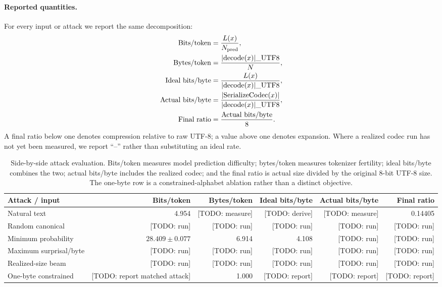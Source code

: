 \documentclass{article}
\newcommand{\todo}[1]{\textcolor{blueprint}{[TODO: #1]}}
\newcommand{\bytes}[1]{\lvert #1\rvert\_{\mathrm{UTF8}}}
\begin{document}
\paragraph{Reported quantities.}
For every input or attack we report the same decomposition:
\begin{align}
  \text{Bits/token} &= \frac{L(x)}{N_{\rm pred}},\\
  \text{Bytes/token} &= \frac{\bytes{\operatorname{decode}(x)}}{N},\\
  \text{Ideal bits/byte} &= \frac{L(x)}{\bytes{\operatorname{decode}(x)}},\\
  \text{Actual bits/byte} &=
  \frac{\left|\operatorname{SerializeCodec}(x)\right|}
       {\bytes{\operatorname{decode}(x)}},\\
  \text{Final ratio} &= \frac{\text{Actual bits/byte}}{8}.
\end{align}
A final ratio below one denotes compression relative to raw UTF-8; a value above
one denotes expansion. Where a realized codec run has not yet been measured, we
report ``--'' rather than substituting an ideal rate.

\begin{table}[t]
  \centering
  \small
  \caption{Side-by-side attack evaluation. Bits/token measures model prediction
  difficulty; bytes/token measures tokenizer fertility; ideal bits/byte combines
  the two; actual bits/byte includes the realized codec; and the final ratio is
  actual size divided by the original 8-bit UTF-8 size. The one-byte row is a
  constrained-alphabet ablation rather than a distinct objective.}
  \label{tab:decisive}
  \begin{tabular}{@{}lrrrrr@{}}
    \toprule
    Attack / input & Bits/token & Bytes/token & Ideal bits/byte & Actual bits/byte & Final ratio \\
    \midrule
    Natural text & 4.954 & \todo{measure} & \todo{derive} & \todo{measure} & 0.14405 \\
    Random canonical & \todo{run} & \todo{run} & \todo{run} & \todo{run} & \todo{run} \\
    Minimum probability & $28.409\pm0.077$ & 6.914 & 4.108 & \todo{run} & \todo{run} \\
    Maximum surprisal/byte & \todo{run} & \todo{run} & \todo{run} & \todo{run} & \todo{run} \\
    Realized-size beam & \todo{run} & \todo{run} & \todo{run} & \todo{run} & \todo{run} \\
    \midrule
    One-byte constrained & \todo{report matched attack} & 1.000 & \todo{report} & \todo{report} & \todo{report} \\
    \bottomrule
  \end{tabular}
\end{table}
\end{document}
